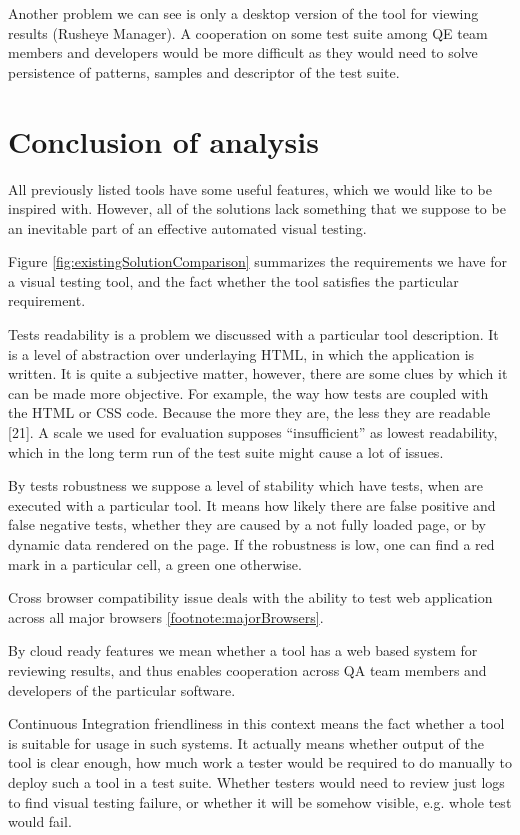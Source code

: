 \documentclass[11pt,oneside,final]{fithesis2}
\begin{document}
  Another problem we can see is only a desktop version of the tool for viewing results (Rusheye Manager). A cooperation on some test suite among QE team members and developers would be 
  more difficult as they would need to solve persistence of patterns, samples and descriptor of the test suite.
  
  \section{Conclusion of analysis}
  \label{chap:conclusion}
  All previously listed tools have some useful features, which we would like to be inspired with. However, all of the solutions lack something that we suppose to be an inevitable part of 
  an effective automated visual testing.
  
  Figure \ref{fig:existingSolutionComparison} summarizes the requirements we have for a visual testing tool, and the fact whether the tool satisfies the particular requirement.
  
  Tests readability is a problem we discussed with a particular tool description. It is a level of abstraction over underlaying HTML, in which the application is written. It is quite a subjective
  matter, however, there are some clues by which it can be made more objective. For example, the way how tests are coupled with the HTML or CSS code. Because the more they are, the less they 
  are readable [21]. A scale we used for evaluation supposes ``insufficient'' as lowest readability, which in the long term run of the test suite might cause a lot of issues.
  
  By tests robustness we suppose a level of stability which have tests, when are executed with a particular tool. 
  It means how likely there are false positive and false negative tests, whether they are caused by a not fully loaded page, or by dynamic data rendered on the page. If the robustness is low,
  one can find a red mark in a particular cell, a green one otherwise.
  
  Cross browser compatibility issue deals with the ability to test web application across all major browsers \ref{footnote:majorBrowsers}.
  
  By cloud ready features we mean whether a tool has a web based system for reviewing results, and thus enables cooperation across QA team members and developers of the particular software.
  
  Continuous Integration friendliness in this context means the fact whether a tool is suitable for usage in such systems. It actually means whether output of the tool is clear enough,
  how much work a tester would be required to do manually to deploy such a tool in a test suite. Whether testers would need to review just logs to find visual testing failure, or
  whether it will be somehow visible, e.g. whole test would fail.
  
\end{document}
